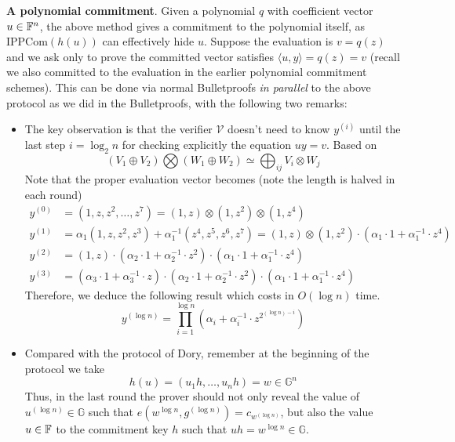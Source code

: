 \documentclass{article}
\begin{document}
\textbf{A polynomial commitment}. Given a polynomial $q$ with coefficient vector $u \in \mathbb{F}^n$, the above method gives a commitment to the polynomial itself, as $\text{IPPCom}(h(u))$ can effectively hide $u$. Suppose the evaluation is $v = q(z)$ and we ask only to prove the committed vector satisfies $\langle u, y \rangle = q(z) = v$ (recall we also committed to the evaluation in the earlier polynomial commitment schemes). This can be done via normal Bulletproofs \textit{in parallel} to the above protocol as we did in the Bulletproofs, with the following two remarks: 
\begin{itemize}
\item The key observation is that the verifier $\mathcal{V}$ doesn't need to know $y^{(i)}$ until the last step $i = \log_2 n$ for checking explicitly the equation $uy = v$. Based on 
\begin{equation*}
\left( V_1 \oplus V_2 \right) \bigotimes \left( W_1 \oplus W_2\right) \simeq \bigoplus_{ij} V_i \otimes W_j
\end{equation*}
Note that the proper evaluation vector becomes (note the length is halved in each round)
\begin{equation*}
\begin{split}
y^{(0)} & = \left( 1, z, z^2, \dots, z^7 \right) = \left( 1, z \right) \otimes \left( 1, z^2 \right) \otimes \left( 1, z^4 \right) \\
y^{(1)} & = \alpha_1 (1, z, z^2, z^3) + \alpha_1^{-1} (z^4, z^5, z^6, z^7) = \left( 1, z \right) \otimes \left( 1, z^2 \right) \cdot \left( \alpha_1 \cdot 1 +  \alpha_1^{-1} \cdot z^4 \right) \\
y^{(2)} & =  \left( 1, z \right) \cdot \left( \alpha_2 \cdot 1 + \alpha_2^{-1} \cdot z^2 \right) \cdot \left( \alpha_1 \cdot 1 + \alpha_1^{-1} \cdot z^4 \right) \\
y^{(3)} & = \left( \alpha_3 \cdot 1 + \alpha_3^{-1} \cdot z \right) \cdot \left( \alpha_2 \cdot 1 + \alpha_2^{-1} \cdot z^2 \right) \cdot \left( \alpha_1 \cdot 1 + \alpha_1^{-1} \cdot z^4 \right)
\end{split}
\end{equation*}
Therefore, we deduce the following result which costs in $O(\log n)$ time. 
\begin{equation*}
y^{(\log n)} = \prod_{i = 1}^{\log n} (\alpha_i + \alpha_i^{-1} \cdot z^{2^{(\log n) - i}})
\end{equation*}
\item Compared with the protocol of Dory, remember at the beginning of the protocol we take
\begin{equation*}
h(u) = (u_1h, \dots, u_nh) = w \in \mathbb{G}^n
\end{equation*}
Thus, in the last round the prover should not only reveal the value of $u^{(\log n)} \in \mathbb{G}$ such that $e(w^{\log n}, g^{(\log n)}) = c_{w^{(\log n)}}$, but also the value $u \in \mathbb{F}$ to the commitment key $h$ such that $uh = w^{\log n} \in \mathbb{G}$.
\end{itemize}
\end{document}
